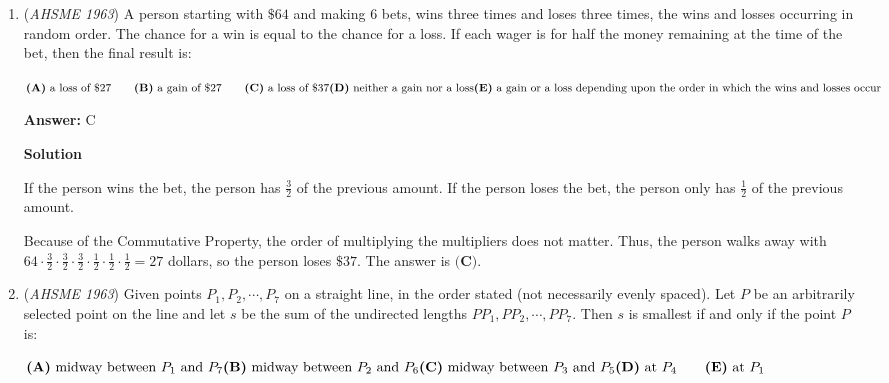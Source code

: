 \begin{enumerate}
 Testing $b = 8$ results in the area being $\sqrt{6 \cdot 4 \cdot 3 \cdot 16 \cdot 5} = \sqrt{2^7 \cdot 3^2 \cdot 5}$, so $8$ does not work.  However, testing $b = 10$ results in the area being $\sqrt{6 \cdot 4 \cdot 3 \cdot 14 \cdot 7} = \sqrt{2^4 \cdot 3^2 \cdot 7^2}$, so $10$ works.  The third side is $17$, and the sides satisfy the \href{https://artofproblemsolving.com/wiki/index.php?title=Triangle\_Inequality}{Triangle Inequality}, so the answer is $\boxed{\textbf{(B)}}$.

 


	\item (\textit{AHSME 1963}) A person starting with $\$64$ and making $6$ bets, wins three times and loses three times, 
the wins and losses occurring in random order. The chance for a win is equal to the chance for a loss. 
If each wager is for half the money remaining at the time of the bet, then the final result is:


 $\textbf{(A)}\text{ a loss of }\$ 27 \qquad \textbf{(B)}\text{ a gain of }\$ 27 \qquad \textbf{(C)}\text{ a loss of }\$ 37 \qquad \\ \textbf{(D)}\text{ neither a gain nor a loss}\qquad \\ \textbf{(E)}\text{ a gain or a loss depending upon the order in which the wins and losses occur}$

 \textbf{Answer: }C



\textbf{Solution}

If the person wins the bet, the person has $\frac{3}{2}$ of the previous amount.  If the person loses the bet, the person only has $\frac{1}{2}$ of the previous amount.

 Because of the Commutative Property, the order of multiplying the multipliers does not matter.  Thus, the person walks away with $64 \cdot \frac{3}{2} \cdot \frac{3}{2} \cdot \frac{3}{2} \cdot \frac{1}{2} \cdot \frac{1}{2} \cdot \frac{1}{2} = 27$ dollars, so the person loses $\$ 37$.  The answer is $\boxed{\textbf{(C)}}$.

 


	\item (\textit{AHSME 1963}) Given points $P_1, P_2,\cdots,P_7$ on a straight line, in the order stated (not necessarily evenly spaced). 
Let $P$ be an arbitrarily selected point on the line and let $s$ be the sum of the undirected lengths
$PP_1, PP_2, \cdots , PP_7$. Then $s$ is smallest if and only if the point $P$ is:


 $\textbf{(A)}\ \text{midway between }P_1\text{ and }P_7\qquad \\ \textbf{(B)}\ \text{midway between }P_2\text{ and }P_6\qquad \\ \textbf{(C)}\ \text{midway between }P_3\text{ and }P_5\qquad \\ \textbf{(D)}\ \text{at }P_4 \qquad \textbf{(E)}\ \text{at }P_1$


\end{enumerate}
